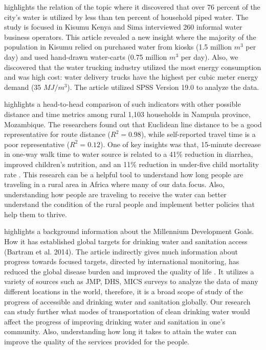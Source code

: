 \documentclass[10pt,twoside]{article}
\numberwithin{equation}{section}
\newcommand{\?}{\stackrel{?}{=}}
\begin{document}
\citet{sima2013water} highlights the relation of the topic where it discovered that over 76 percent of the city's water
is utilized by less than ten percent of household piped water.  The study is focused in Kisumu Kenya and Sima
interviewed 260 informal water business operators. This article revealed a new insight where the majority of the
population in Kisumu relied on purchased water from kiosks (1.5 million $m^{3}$ per day) and used hand-drawn water-carts
(0.75 million $m^{3}$ per day)\citep{sima2013water}. Also, we discovered that the water trucking industry utilized the
most energy consumption and was high cost: water delivery trucks have the highest per cubic meter energy demand (35
$MJ/m^{3}$)\citep{sima2013water}. The article utilized SPSS Version 19.0 to analyze the data.

\citet{ho2014challenge} highlights a head-to-head comparison of such indicators with other possible distance and time
metrics among rural 1,103 households in Nampula province, Mozambique. The researchers found out that Euclidean line
distance to be a good representative for route distance ($R^{2} = 0.98$), while self-reported travel time is a poor
representative ($R^{2} = 0.12$). One of key insights was that, 15-minute decrease in one-way walk time to water source
is related to a 41\% reduction in diarrhea, improved children's nutrition, and an 11\% reduction in under-five child
mortality rate \citep{ho2014challenge}. This research can be a helpful tool to understand how long people are traveling
in a rural area in Africa where many of our data focus. Also, understanding how people are traveling to receive the
water can better understand the condition of the rural people and implement better policies that help them to thrive.

\citet{bartram2014globala} highlights a background information about the Millennium Development Goals. How it has
established global targets for drinking water and sanitation access (Bartram et al. 2014). The article indirectly gives
much information about progress towards focused targets, directed by international monitoring, has reduced the global
disease burden and improved the quality of life \citep{bartram2014globala}. It utilizes a variety of sources such as
JMP, DHS, MICS surveys to analyze the data of many different locations in the world, therefore, it is a broad scope of
study of the progress of accessible and drinking water and sanitation globally. Our research can study further what
modes of transportation of clean drinking water would affect the progress of improving drinking water and sanitation in
one's community. Also, understanding how long it takes to attain the water can improve the quality of the services
provided for the people.
\end{document}
